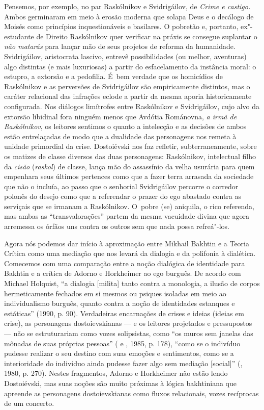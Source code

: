 Pensemos, por exemplo, no par Raskólnikov e Svidrigáilov, de \emph{Crime
e castigo.} Ambos germinaram em meio à erosão moderna que solapa Deus e
o decálogo de Moisés como princípios inquestionáveis e basilares. O
pobretão e, portanto, ex"-estudante de Direito Raskólnikov quer verificar
na práxis se consegue suplantar o \emph{não matarás} para lançar mão de
seus projetos de reforma da humanidade. Svidrigáilov, aristocrata
lascivo, entrevê possibilidades (ou melhor, aventuras) algo distintas (e
mais luxuriosas) a partir do esfacelamento da instância moral: o
estupro, a extorsão e a pedofilia. É~bem verdade que os homicídios de
Raskólnikov e as perversões de Svidrigáilov são empiricamente distintos,
mas o caráter relacional das infrações eclode a partir da mesma aporia
historicamente configurada. Nos diálogos limítrofes entre Raskólnikov e
Svidrigáilov, cujo alvo da extorsão libidinal fora ninguém menos que
Avdótia Románovna, \emph{a irmã de Raskólnikov}, os leitores sentimos o
quanto a intelecção e as decisões de ambos estão entrelaçadas de modo
que a dualidade das personagens nos remeta à unidade primordial da
crise. Dostoiévski nos faz refletir, subterraneamente, sobre os matizes
de classe diversos das duas personagens: Raskólnikov, intelectual filho
da \emph{cisão} (\emph{raskol}) de classe, lança mão do assassínio da
velha usurária para quem empenhara seus últimos pertences como que a
fazer terra arrasada da sociedade que não o incluía, ao passo que o
senhorial Svidrigáilov percorre o corredor polonês do desejo como que a
referendar o prazer do ego abastado contra as serviçais que se irmanam a
Raskólnikov. O~pobre (se) aniquila, o rico referenda, mas ambas as
``transvalorações'' partem da mesma vacuidade divina que agora arremessa
os órfãos uns contra os outros sem que nada possa refreá"-los.

Agora nós podemos dar início à aproximação entre Mikhail Bakhtin e a
Teoria Crítica como uma mediação que nos levará da dialogia e da
polifonia à dialética. Comecemos com uma comparação entre a noção
dialógica de identidade para Bakhtin e a crítica de Adorno e Horkheimer
ao ego burguês. De acordo com Michael Holquist, ``a dialogia
{[}milita{]} tanto contra a monologia, a ilusão de corpos hermeticamente
fechados em si mesmos ou psiques isoladas em meio ao individualismo
burguês, quanto contra a noção de identidades estanques e estáticas''
(1990, p. 90). Verdadeiras encarnações de crises e ideias (ideias em
crise), as personagens dostoievskianas --- e os leitores projetados e
pressupostos --- não se estruturariam como vozes solipsistas, como ``os
muros sem janelas das mônadas de suas próprias pessoas'' ( e
, 1985, p. 178), ``como se o indivíduo pudesse realizar o seu
destino com suas emoções e sentimentos, como se a interioridade do
indivíduo ainda pudesse fazer algo sem mediação {[}social{]}'' (,
1980, p. 270). Nestes fragmentos, Adorno e Horkheimer não estão lendo
Dostoiévski, mas suas noções são muito próximas à lógica bakhtiniana que
apreende as personagens dostoievskianas como fluxos relacionais, vozes
recíprocas de um concerto.

